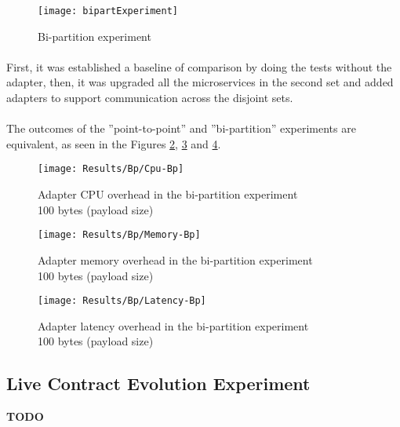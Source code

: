 \begin{figure}[htbp]
    \centering
    \texttt{[image: bipartExperiment]}
    \caption{Bi-partition experiment}
    \label{fig:biPart}
\end{figure}

\paragraph{}

First, it was established a baseline of comparison by doing the tests without the adapter,
then, it was upgraded all the microservices in the second set and added adapters to support communication across the disjoint sets.

\paragraph{}

The outcomes of the ''point-to-point'' and ''bi-partition'' experiments are equivalent, as seen in the Figures \ref{fig:biPartCPU}, \ref{fig:biPartMem} and \ref{fig:biPartLatency}.

\begin{figure}[htbp]
    \centering
    \texttt{[image: Results/Bp/Cpu-Bp]}
    \caption{Adapter CPU overhead in the bi-partition experiment \\\hspace{\textwidth} 100 bytes (payload size)}
    \label{fig:biPartCPU}
\end{figure}

\begin{figure}[htbp]
    \centering
    \texttt{[image: Results/Bp/Memory-Bp]}
    \caption{Adapter memory overhead in the bi-partition experiment \\\hspace{\textwidth} 100 bytes (payload size)}
    \label{fig:biPartMem}
\end{figure}

\begin{figure}[htbp]
    \centering
    \texttt{[image: Results/Bp/Latency-Bp]}
    \caption{Adapter latency overhead in the bi-partition experiment \\\hspace{\textwidth} 100 bytes (payload size)}
    \label{fig:biPartLatency}
\end{figure}

\subsection{Live Contract Evolution Experiment}

\textbf{TODO}